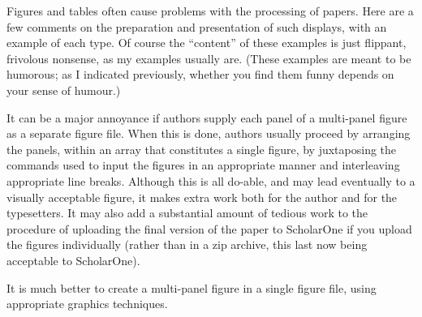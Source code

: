 \documentclass[
doublespace,
  times]{anzsauth}
\begin{document}
Figures and tables often cause problems with the processing of papers.
Here are a few comments on the preparation and presentation of such
displays, with an example of each type. Of course the ``content'' of
these examples is just flippant, frivolous nonsense, as my examples
usually are. (These examples are meant to be humorous; as I indicated
previously, whether you find them funny depends on your sense of
humour.)

It can be a major annoyance if authors supply each panel of a
multi-panel figure as a separate figure file. When this is done, authors
usually proceed by arranging the panels, within an array that
constitutes a single figure, by juxtaposing the commands used to input
the figures in an appropriate manner and interleaving appropriate line
breaks. Although this is all do-able, and may lead eventually to a
visually acceptable figure, it makes extra work both for the author and
for the typesetters. It may also add a substantial amount of tedious
work to the procedure of uploading the final version of the paper to
ScholarOne if you upload the figures individually (rather than in a zip
archive, this last now being acceptable to ScholarOne).

It is much better to create a multi-panel figure in a single figure
file, using appropriate graphics techniques.
\end{document}

